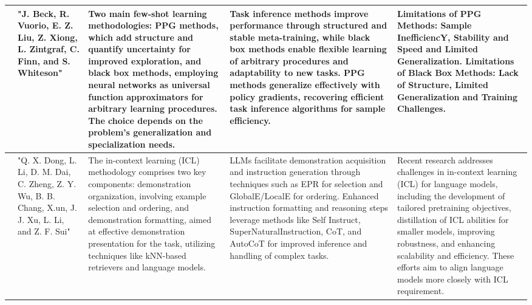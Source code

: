 \documentclass[fleqn,10pt]{thescipub} %
\begin{document}
\begin{table}
\begin{center}
\begin{tabular}{ |p{1cm}|p{2cm}|p{4cm}|p{4cm}|p{4cm}| }
\hline
[37] & "J. Beck, R. Vuorio, E. Z. Liu, Z. Xiong, L. Zintgraf, C. Finn, and S. Whiteson" & Two main few-shot learning methodologies: PPG methods, which add structure and quantify uncertainty for improved exploration, and black box methods, employing neural networks as universal function approximators for arbitrary learning procedures. The choice depends on the problem's generalization and specialization needs. & Task inference methods improve performance through structured and stable meta-training, while black box methods enable flexible learning of arbitrary procedures and adaptability to new tasks. PPG methods generalize effectively with policy gradients, recovering efficient task inference algorithms for sample efficiency. & Limitations of PPG Methods: Sample InefficiencY, Stability and Speed and Limited Generalization. Limitations of Black Box Methods: Lack of Structure, Limited Generalization and Training Challenges. \\
\hline
[38]  & "Q. X. Dong, L. Li, D. M. Dai, C. Zheng, Z. Y. Wu, B. B. Chang, X.un, J. J. Xu, L. Li, and Z. F. Sui" & The in-context learning (ICL) methodology comprises two key components: demonstration organization, involving example selection and ordering, and demonstration formatting, aimed at effective demonstration presentation for the task, utilizing techniques like kNN-based retrievers and language models. & LLMs facilitate demonstration acquisition and instruction generation through techniques such as EPR for selection and GlobalE/LocalE for ordering. Enhanced instruction formatting and reasoning steps leverage methods like Self Instruct, SuperNaturalInstruction, CoT, and AutoCoT for improved inference and handling of complex tasks. & Recent research addresses challenges in in-context learning (ICL) for language models, including the development of tailored pretraining objectives, distillation of ICL abilities for smaller models, improving robustness, and enhancing scalability and efficiency. These efforts aim to align language models more closely with ICL requirement. \\
\hline
\end{tabular}
\end{center}
\end{table}
\end{document}
